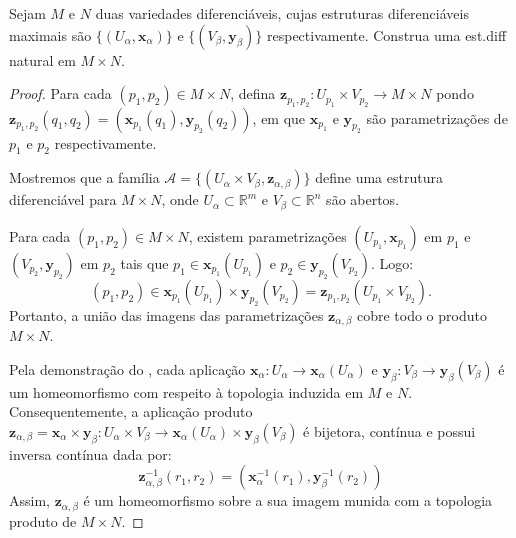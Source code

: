 	\begin{definition}
		\label{def:variedade-produto}
		Sejam $M$ e $N$ duas variedades diferenciáveis, cujas estruturas diferenciáveis maximais são $\{ (U_{\alpha}, \mathbf{x}_{\alpha}) \}$ e $\{ (V_{\beta},\mathbf{y}_{\beta}) \}$ respectivamente. Construa uma est.diff natural em $M\times N$.
		\begin{proof}

			Para cada $(p_1, p_2) \in M\times N$, defina $\mathbf{z}_{p_1,p_2}:U_{p_1} \times V_{p_2}\to M\times N$ pondo $\mathbf{z}_{p_1,p_2}(q_{1}, q_{2})=(\mathbf{x}_{p_{1}}(q_{1}), \mathbf{y}_{p_{2}}(q_{2}))$, em que $\mathbf{x}_{p_{1}}$ e $\mathbf{y}_{p_{2}}$ são parametrizações de $p_{1}$ e $p_{2}$ respectivamente.

			Mostremos que a família $\mathcal{A} = \{ (U_{\alpha} \times V_{\beta}, \mathbf{z}_{\alpha, \beta}) \}$ define uma estrutura diferenciável para $M \times N$, onde $U_{\alpha} \subset \mathbb{R}^m$ e $V_{\beta} \subset \mathbb{R}^n$ são abertos.

			Para cada $(p_1, p_2) \in M \times N$, existem parametrizações $(U_{p_1}, \mathbf{x}_{p_1})$ em $p_1$ e $(V_{p_2}, \mathbf{y}_{p_2})$ em $p_2$ tais que $p_1 \in \mathbf{x}_{p_1}(U_{p_1})$ e $p_2 \in \mathbf{y}_{p_2}(V_{p_2})$. Logo:
			\begin{equation*}
				(p_1, p_2) \in \mathbf{x}_{p_1}(U_{p_1}) \times \mathbf{y}_{p_2}(V_{p_2}) = \mathbf{z}_{p_1, p_2}(U_{p_1} \times V_{p_2}).
			\end{equation*}
			Portanto, a união das imagens das parametrizações $\mathbf{z}_{\alpha, \beta}$ cobre todo o produto $M \times N$.

			Pela demonstração do  , cada aplicação $\mathbf{x}_{\alpha}: U_{\alpha} \to \mathbf{x}_{\alpha}(U_{\alpha})$ e $\mathbf{y}_{\beta}: V_{\beta} \to \mathbf{y}_{\beta}(V_{\beta})$ é um homeomorfismo com respeito à topologia induzida em $M$ e $N$.
			Consequentemente, a aplicação produto $\mathbf{z}_{\alpha, \beta} = \mathbf{x}_{\alpha} \times \mathbf{y}_{\beta}: U_{\alpha} \times V_{\beta} \to \mathbf{x}_{\alpha}(U_{\alpha}) \times \mathbf{y}_{\beta}(V_{\beta})$ é bijetora, contínua e possui inversa contínua dada por:
			\begin{equation*}
				\mathbf{z}_{\alpha, \beta}^{-1}(r_1, r_2) = \left(\mathbf{x}_{\alpha}^{-1}(r_1), \mathbf{y}_{\beta}^{-1}(r_2)\right)
			\end{equation*}
			Assim, $\mathbf{z}_{\alpha, \beta}$ é um homeomorfismo sobre a sua imagem munida com a topologia produto de $M \times N$.


\end{proof}
\end{definition}
